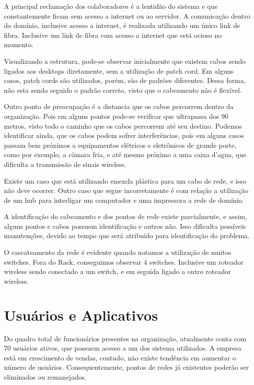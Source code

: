 \documentclass[	DIV=calc,%
							paper=a4,%
							fontsize=12pt,%
							onecolumn]{scrartcl}	 					%
\begin{document}
A principal reclamação dos colaboradores é a lentidão do sistema e que constantemente ficam sem acesso a internet ou ao servidor. A comunicação dentro do domínio, inclusive acesso a internet, é realizada utilizando um único link de fibra. Inclusive um link de fibra com acesso a internet que está ocioso no momento.

Visualizando a estrutura, pode-se observar inicialmente que existem cabos sendo ligados aos desktops diretamente, sem a utilização de patch cord. Em alguns casos, patch cords são utilizados, porém, são de padrões diferentes. Dessa forma, não esta sendo seguido o padrão correto, visto que o cabeamento não é flexível.

Outro ponto de preocupação é a distancia que os cabos percorrem dentro da organização. Pois em alguns pontos pode-se verificar que ultrapassa dos 90 metros, visto todo o caminho que os cabos percorrem até seu destino. Podemos identificar ainda, que os cabos podem sofrer interferências, pois em alguns casos passam bem próximos a equipamentos elétricos e eletrônicos de grande porte, como por exemplo, a câmara fria, e até mesmo próximo a uma caixa d’agua, que dificulta a transmissão de sinais wireless.

Existe um caso que está utilizando emenda plástica para um cabo de rede, e isso não deve ocorrer. Outro caso que segue incorretamente é com relação a utilização de um hub para interligar um computador e uma impressora a rede de domínio.

A identificação do cabeamento e dos pontos de rede existe parcialmente, e assim, alguns pontos e cabos possuem identificação e outros não. Isso dificulta possíveis manutenções, devido ao tempo que será atribuído para identificação do problema.

O cascateamento da rede é evidente quando notamos a utilização de muitos switches. Fora do Rack, conseguimos observar 4 switches. Inclusive um roteador wireless sendo conectado a um switch, e em seguida ligado a outro roteador wireless. 


\section{Usuários e Aplicativos}
Do quadro total de funcionários presentes na organização, atualmente conta com 70 usuários ativos, que possuem acesso a um dos sistema utilizados. A empresa está em crescimento de vendas, contudo, não existe tendência em aumentar o número de usuários. Consequentemente, pontos de redes já existentes poderão ser eliminados ou remanejados.
\end{document}
